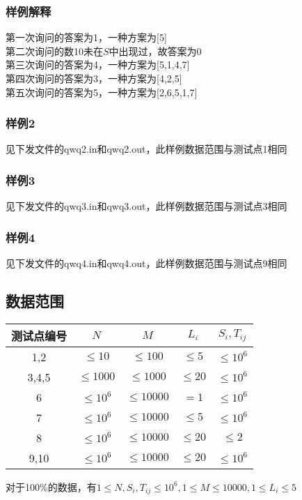 \documentclass[12pt]{ctexart}
\begin{document}
\subsubsection{样例解释}
\noindent 第一次询问的答案为1，一种方案为[5]\\
第二次询问的数10未在$S$中出现过，故答案为0\\
第三次询问的答案为4，一种方案为[5,1,4,7]\\
第四次询问的答案为3，一种方案为[4,2,5]\\
第五次询问的答案为5，一种方案为[2,6,5,1,7]
\subsubsection{样例2}
见下发文件的qwq2.in和qwq2.out，此样例数据范围与测试点1相同
\subsubsection{样例3}
见下发文件的qwq3.in和qwq3.out，此样例数据范围与测试点3相同
\subsubsection{样例4}
见下发文件的qwq4.in和qwq4.out，此样例数据范围与测试点9相同
\subsection{数据范围}
\begin{center}
	\begin{tabular}{|c|c|c|c|c|}
		\hline 测试点编号&$N$&$M$&$L_i$&$S_i,T_{ij}$\\
		\hline 1,2&$\leq10$&$\leq100$&$\leq5$&$\leq10^6$\\
		\hline 3,4,5&$\leq1000$&$\leq1000$&$\leq20$&$\leq10^6$\\
		\hline 6&$\leq10^6$&$\leq10000$&$=1$&$\leq10^6$\\
		\hline 7&$\leq10^6$&$\leq10000$&$\leq 5$&$\leq10^6$\\
		\hline 8&$\leq10^6$&$\leq10000$&$\leq 20$&$\leq2$\\
		\hline 9,10&$\leq10^6$&$\leq10000$&$\leq 20$&$\leq10^6$\\
		\hline
	\end{tabular}
\end{center}
对于100\%的数据，有$1\le N,S_i,T_{ij}\le10^6,1\le M\le10000,1\le L_i\le5$
\end{document}
